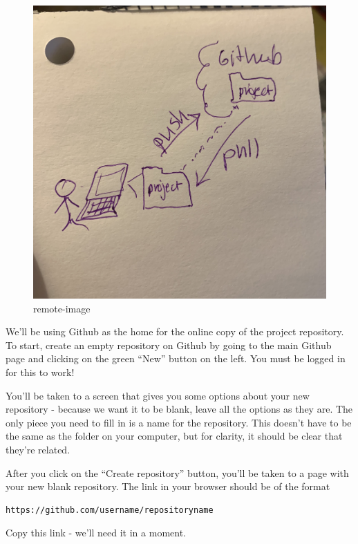 \documentclass[]{Nemilov}
\begin{document}
\begin{figure}
\centering
\includegraphics{figures/py-version-control/tmp-remote.jpeg}
\caption{remote-image}
\end{figure}

We'll be using Github as the home for the online copy of the project repository.
To start, create an empty repository on Github by going to the main Github
page and clicking on the green ``New'' button on the left. You must be logged in
for this to work!

You'll be taken to a screen that gives you some options about
your new repository - because we want it to be blank, leave all the options as
they are. The only piece you need to fill in is a name for the repository. This
doesn't have to be the same as the folder on your computer, but for clarity, it
should be clear that they're related.

After you click on the ``Create repository'' button, you'll be taken to a page
with your new blank repository. The link in your browser should be of the format

\begin{verbatim}
https://github.com/username/repositoryname
\end{verbatim}

Copy this link - we'll need it in a moment.
\end{document}
